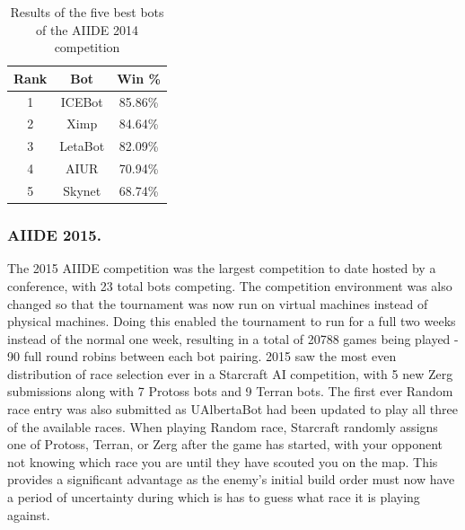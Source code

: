 \documentclass{llncs}
\begin{document}
\begin{table}[!t]
\caption{Results of the five best bots of the AIIDE 2014 competition}
\label{tab:aiide2014}
\centering
\begin{tabular}{|c|c|c|}
\hline
{\bfseries Rank} & {\bfseries Bot} & {\bfseries Win \%} \\
\hline
1 & ICEBot & 85.86\% \\
2 & Ximp & 84.64\% \\
3 & LetaBot & 82.09\% \\
4 & AIUR & 70.94\% \\
5 & Skynet & 68.74\% \\
\hline
\end{tabular}
\end{table}

\subsubsection*{AIIDE 2015.}

The 2015 AIIDE competition was  the largest competition to date hosted
by a conference, with 23 total bots competing. The competition environment was also changed so that the tournament was now run on virtual machines instead of physical machines. Doing this enabled the tournament to run for a full two weeks instead of the normal one week, resulting in a total of 20788 games being played - 90 full round robins between each bot pairing. 2015 saw the most even distribution of race selection ever in a Starcraft AI competition, with 5 new Zerg submissions along with 7 Protoss bots and 9 Terran bots. The first ever Random race entry was also submitted as UAlbertaBot had been updated to play all three of the available races. When playing Random race, Starcraft randomly assigns one of Protoss, Terran, or Zerg after the game has started, with your opponent not knowing which race you are until they have scouted you on the map. This provides a significant advantage as the enemy's initial build order must now have a period of uncertainty during which is has to guess what race it is playing against.
\end{document}
